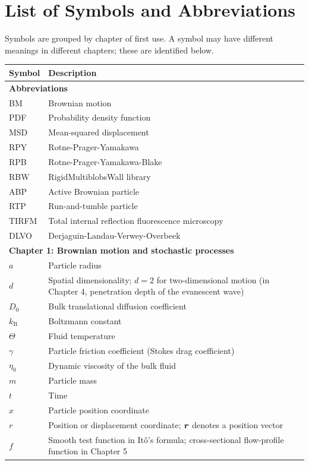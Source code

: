 \chapter*{List of Symbols and Abbreviations}

Symbols are grouped by chapter of first use. A symbol may have different meanings in different chapters; these are identified below.
\begin{longtable}{p{3cm}p{11cm}}
\hline
Symbol & Description \\
\hline
\multicolumn{2}{l}{\textbf{Abbreviations}}\\
BM & Brownian motion \\
PDF & Probability density function \\
MSD & Mean-squared displacement \\
RPY & Rotne-Prager-Yamakawa \\
RPB & Rotne-Prager-Yamakawa-Blake \\
RBW & RigidMultiblobsWall library \\
ABP & Active Brownian particle \\
RTP & Run-and-tumble particle \\
TIRFM & Total internal reflection fluorescence microscopy \\
DLVO & Derjaguin-Landau-Verwey-Overbeek \\
\hline
\multicolumn{2}{l}{\textbf{Chapter 1: Brownian motion and stochastic processes}}\\
$a$ & Particle radius \\
$d$ & Spatial dimensionality; $d=2$ for two-dimensional motion (in Chapter 4, penetration depth of the evanescent wave) \\
$D_0$ & Bulk translational diffusion coefficient \\
$k_\mathrm{B}$ & Boltzmann constant \\
$\Theta$ & Fluid temperature \\
$\gamma$ & Particle friction coefficient (Stokes drag coefficient) \\
$\eta_0$ & Dynamic viscosity of the bulk fluid \\
$m$ & Particle mass \\
$t$ & Time \\
$x$ & Particle position coordinate \\
$r$ & Position or displacement coordinate; $\bm{r}$ denotes a position vector \\
$f$ & Smooth test function in It\^o's formula; cross-sectional flow-profile function in Chapter 5 \\

\end{longtable}
